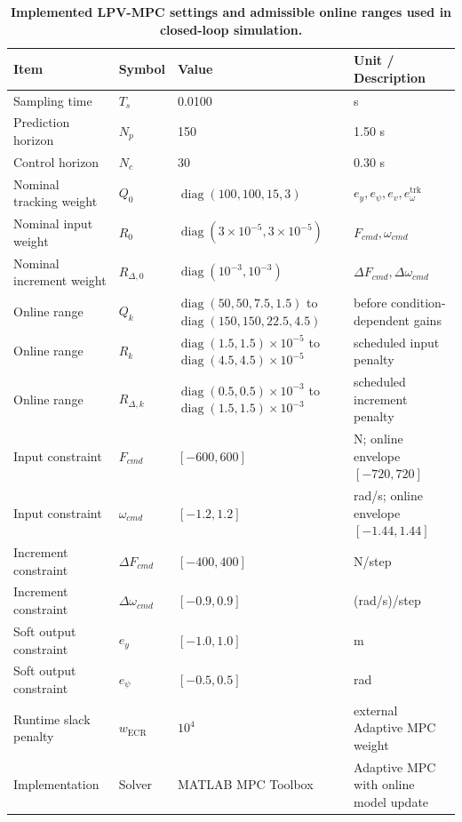 \documentclass{ieeeaccess}
\begin{document}
\begin{table}[!t]
\centering
\caption{\textbf{Implemented LPV-MPC settings and admissible online ranges used in closed-loop simulation.}}
\label{tab:mpc_settings}
\setlength{\tabcolsep}{3pt}
\begin{tabular}{|p{}|p{}|p{}|p{}|}
\hline
Item & Symbol & Value & Unit / Description \\
\hline
Sampling time & $T_s$ & 0.0100 & s \\
Prediction horizon & $N_p$ & 150 & 1.50 s \\
Control horizon & $N_c$ & 30 & 0.30 s \\
Nominal tracking weight & $Q_0$ & $\operatorname{diag}(100,100,15,3)$ & $e_y,e_\psi,e_v,e_\omega^{\mathrm{trk}}$ \\
Nominal input weight & $R_0$ & $\operatorname{diag}(3\!\times\!10^{-5},3\!\times\!10^{-5})$ & $F_{cmd},\omega_{cmd}$ \\
Nominal increment weight & $R_{\Delta,0}$ & $\operatorname{diag}(10^{-3},10^{-3})$ & $\Delta F_{cmd},\Delta\omega_{cmd}$ \\
Online range & $Q_k$ & $\operatorname{diag}(50,50,7.5,1.5)$ to $\operatorname{diag}(150,150,22.5,4.5)$ & before condition-dependent gains \\
Online range & $R_k$ & $\operatorname{diag}(1.5,1.5)\!\times\!10^{-5}$ to $\operatorname{diag}(4.5,4.5)\!\times\!10^{-5}$ & scheduled input penalty \\
Online range & $R_{\Delta,k}$ & $\operatorname{diag}(0.5,0.5)\!\times\!10^{-3}$ to $\operatorname{diag}(1.5,1.5)\!\times\!10^{-3}$ & scheduled increment penalty \\
Input constraint & $F_{cmd}$ & $[-600,600]$ & N; online envelope $[-720,720]$ \\
Input constraint & $\omega_{cmd}$ & $[-1.2,1.2]$ & rad/s; online envelope $[-1.44,1.44]$ \\
Increment constraint & $\Delta F_{cmd}$ & $[-400,400]$ & N/step \\
Increment constraint & $\Delta\omega_{cmd}$ & $[-0.9,0.9]$ & (rad/s)/step \\
Soft output constraint & $e_y$ & $[-1.0,1.0]$ & m \\
Soft output constraint & $e_\psi$ & $[-0.5,0.5]$ & rad \\
Runtime slack penalty & $w_{\mathrm{ECR}}$ & $10^4$ & external Adaptive MPC weight \\
Implementation & Solver & MATLAB MPC Toolbox & Adaptive MPC with online model update \\
\hline
\end{tabular}
\end{table}
\end{document}
